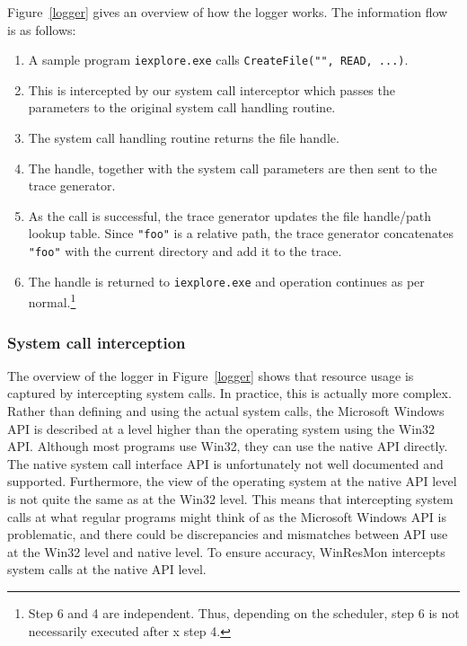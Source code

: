 Figure~\ref{logger} gives an overview of how the logger works.
The information flow is as follows:

\begin{enumerate}
\item A sample program {\small\tt iexplore.exe} calls
{\small\tt CreateFile("", READ, ...)}.
\item This is intercepted by our system call interceptor
which passes the parameters to the original system call handling routine.
\item The system call handling routine returns the file handle.
\item The handle, together with the system call parameters are then sent to
the trace generator.
\item As the call is successful, the trace generator updates 
the file handle/path lookup table.
Since {\small\tt "foo"} is a relative path, the trace generator concatenates
{\small\tt "foo"} with the current directory and add it to the trace.
\item The handle is returned to {\small\tt iexplore.exe} and operation
continues as per normal.\footnote{Step 6 and 4 are independent.
Thus, depending on the scheduler, step 6 is not necessarily executed after
x
step 4.} 
\end{enumerate}


\subsubsection{System call interception}

The overview of the logger in Figure~\ref{logger} shows that resource usage is
captured by intercepting system calls.  In practice, this is actually more
complex.  Rather than defining and using the actual system calls, the
Microsoft Windows API is described at a level higher than the operating system
using the Win32 API.  Although most programs use Win32, they can use the
native API \cite{nebbett2000windows} directly.  The native system call interface API
is unfortunately not well documented and supported.  Furthermore, the view of
the operating system at the native API level is not quite the same as at the
Win32 level.  This means that intercepting system calls at what regular
programs might think of as the Microsoft Windows API is problematic, and there
could be discrepancies and mismatches between API use at the Win32 level and
native level.  To ensure accuracy, WinResMon intercepts system calls at the
native API level.

